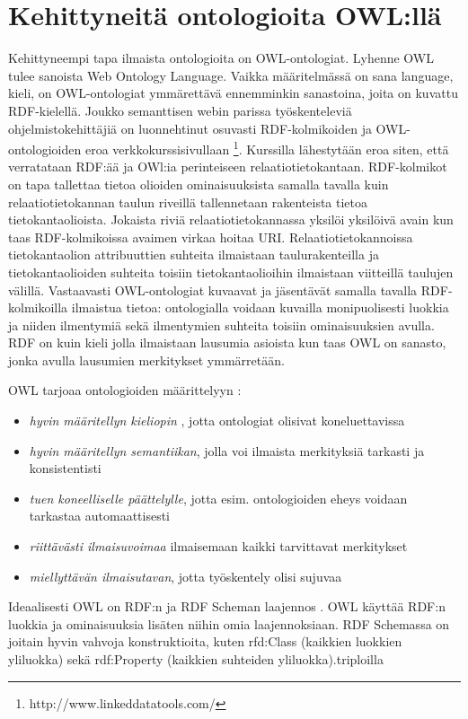 \documentclass[finnish]{tktltiki2}
\theoremstyle{definition}
\theoremstyle{remark}
\begin{document}
\section{Kehittyneitä ontologioita OWL:llä}

Kehittyneempi tapa ilmaista ontologioita on OWL-ontologiat. Lyhenne OWL tulee 
sanoista Web Ontology Language. Vaikka määritelmässä on sana language, kieli, on 
OWL-ontologiat ymmärettävä ennemminkin sanastoina, joita on kuvattu RDF-kielellä.
Joukko semanttisen webin parissa työskenteleviä ohjelmistokehittäjiä on luonnehtinut osuvasti RDF-kolmikoiden ja OWL-ontologioiden eroa verkkokurssisivullaan \footnote{http://www.linkeddatatools.com/}.
Kurssilla lähestytään eroa siten, että verratataan RDF:ää ja OWl:ia perinteiseen relaatiotietokantaan. RDF-kolmikot on tapa tallettaa tietoa olioiden ominaisuuksista samalla tavalla kuin
relaatiotietokannan taulun riveillä tallennetaan rakenteista tietoa tietokantaolioista. Jokaista riviä relaatiotietokannassa
yksilöi yksilöivä avain kun taas RDF-kolmikoissa avaimen virkaa hoitaa URI. Relaatiotietokannoissa tietokantaolion attribuuttien suhteita ilmaistaan taulurakenteilla ja tietokantaolioiden suhteita toisiin tietokantaolioihin ilmaistaan viitteillä taulujen välillä. Vastaavasti OWL-ontologiat kuvaavat ja jäsentävät  samalla tavalla RDF-kolmikoilla ilmaistua tietoa: ontologialla voidaan kuvailla monipuolisesti luokkia ja niiden ilmentymiä sekä ilmentymien suhteita toisiin ominaisuuksien avulla. RDF on kuin kieli jolla ilmaistaan lausumia asioista kun taas OWL on sanasto, jonka avulla lausumien merkitykset ymmärretään. 

OWL tarjoaa ontologioiden määrittelyyn \cite{AH09}: 
\begin{itemize}
\item \textit{hyvin määritellyn kieliopin} , jotta ontologiat olisivat koneluettavissa
\item \textit{hyvin määritellyn semantiikan}, jolla voi ilmaista merkityksiä tarkasti ja konsistentisti
\item \textit{tuen koneelliselle päättelylle}, jotta esim.  ontologioiden eheys voidaan tarkastaa automaattisesti
\item \textit{riittävästi ilmaisuvoimaa} ilmaisemaan kaikki tarvittavat merkitykset
\item \textit{miellyttävän ilmaisutavan}, jotta työskentely olisi sujuvaa
\end{itemize}

Ideaalisesti OWL on RDF:n ja RDF Scheman laajennos \cite{AH09}. OWL käyttää
RDF:n luokkia ja ominaisuuksia lisäten niihin omia laajennoksiaan. RDF Schemassa on joitain 
hyvin vahvoja konstruktioita, kuten rfd:Class
(kaikkien luokkien yliluokka) sekä rdf:Property (kaikkien suhteiden yliluokka).triploilla
\end{document}
